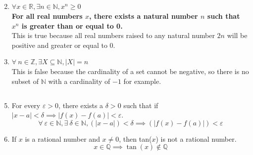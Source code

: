 \documentclass{article}
\begin{document}
\subsection{}
\begin{enumerate}
    \setcounter{enumi}{1}
    \item $\forall x \in \mathbb{R}, \exists n \in \mathbb{N}, x^{n} \geq 0 $ \\
    \textbf{For all real numbers $x$, there exists a natural number $n$ such that
    $x^{n}$ is greater than or equal to 0.} \\
    \color{blue} 
    This is true because all real numbers raised to any natural number $2n$
    will be positive and greater or equal to 0.
    \color{black}

    \setcounter{enumi}{7}
    \item $\forall \ n \in \mathbb{Z}, \exists X \subseteq \mathbb{N}, |X| = n $ \\
    \color{red} 
    This is false because the cardinality of a set cannot be negative, so 
    there is no subset of $\mathbb{N}$ with a cardinality of $-1$ for example.
    \color{black}
\end{enumerate}

\setcounter{subsection}{8}
\subsection{}
\begin{enumerate}
    \setcounter{enumi}{4}
    \item For every $\varepsilon > 0$, there exists a $\delta > 0$ such
    that if $|x - a| < \delta \implies |f(x) - f(a)| < \varepsilon$.
    \color{blue}
    \[
    \forall \ \varepsilon \in \mathbb{N}, \exists \ \delta \in \mathbb{N},
    (|x - a|) < \delta \implies (|f(x) - f(a)|) < \varepsilon
    \]
    \color{black}


    \setcounter{enumi}{8}
    \item If $x$ is a rational number and $x \ne 0$, then tan($x$) is not a rational number. \\
    \color{blue}
    \[
    x \in \mathbb{Q} \implies \tan(x) \notin \mathbb{Q}
    \]
    \color{black}

\end{enumerate}

\end{document}
